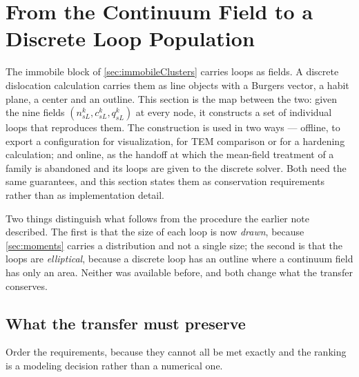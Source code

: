 \documentclass{article}
\begin{document}
\section{From the Continuum Field to a Discrete Loop Population}
\label{sec:conversion}

The immobile block of \cref{sec:immobileClusters} carries loops as fields. A
discrete dislocation calculation carries them as line objects with a Burgers
vector, a habit plane, a center and an outline. This section is the map between
the two: given the nine fields $(n^k_{sL},c^k_{sL},q^k_{sL})$ at every node, it
constructs a set of individual loops that reproduces them. The construction is
used in two ways --- offline, to export a configuration for visualization, for
TEM comparison or for a hardening calculation; and online, as the handoff at
which the mean-field treatment of a family is abandoned and its loops are given
to the discrete solver. Both need the same guarantees, and this section states
them as conservation requirements rather than as implementation detail.

Two things distinguish what follows from the procedure the earlier note
described. The first is that the size of each loop is now \emph{drawn}, because
\cref{sec:moments} carries a distribution and not a single size; the second is
that the loops are \emph{elliptical}, because a discrete loop has an outline
where a continuum field has only an area. Neither was available before, and both
change what the transfer conserves.

\subsection{What the transfer must preserve}
\label{sec:transfer-invariants}

Order the requirements, because they cannot all be met exactly and the ranking
is a modeling decision rather than a numerical one.
\end{document}
